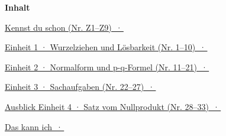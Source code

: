 \documentclass[11pt]{article}
\newcommand{\vzeile}[3]{\noindent\hyperlink{#1}{#2 \,·\, #3}\par\medskip}
\providecommand{\Szone}{}\providecommand{\Seins}{}\providecommand{\Szwei}{}\providecommand{\Sdrei}{}\providecommand{\Svier}{}\providecommand{\Sabhaken}{}
\begin{document}
\weit
{\large\bfseries Inhalt}\par\bigskip
\vzeile{zone}{Kennst du schon (Nr. Z1–Z9)}{\Szone}
\vzeile{e1}{Einheit 1 · Wurzelziehen und Lösbarkeit (Nr. 1–10)}{\Seins}
\vzeile{e2}{Einheit 2 · Normalform und p-q-Formel (Nr. 11–21)}{\Szwei}
\vzeile{e3}{Einheit 3 · Sachaufgaben (Nr. 22–27)}{\Sdrei}
\vzeile{e4}{Ausblick Einheit 4 · Satz vom Nullprodukt (Nr. 28–33)}{\Svier}
\vzeile{abhaken}{Das kann ich}{\Sabhaken}
\clearpage

\clearpage

\clearpage

\clearpage

\clearpage


\end{document}

